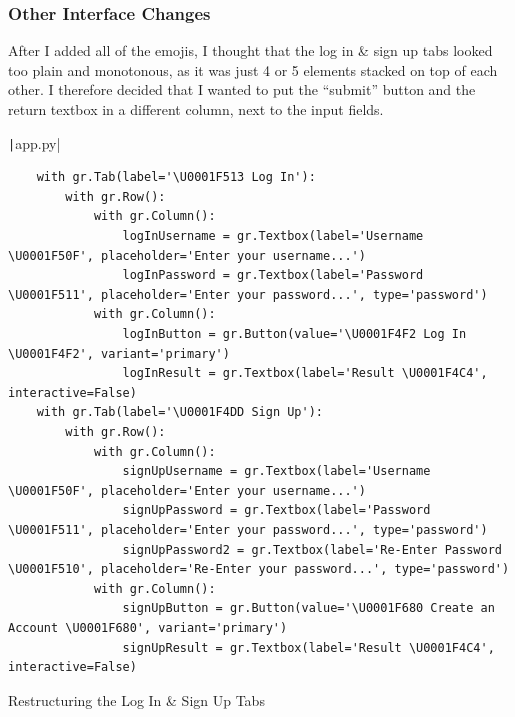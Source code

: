 \documentclass[12pt]{report}
\newcommand{\pil}[1]{\protect\texttt|#1|}
\begin{document}
\begin{center}
\end{center}

\subsubsection{Other Interface Changes}
After I added all of the emojis, I thought that the log in \& sign up tabs looked too plain and monotonous, as it was just 4 or 5 elements stacked on top of each other. I therefore decided that I wanted to put the ``submit'' button and the return textbox in a different column, next to the input fields.

\begin{listing}[H]
\pil{app.py}
\begin{verbatim}
    with gr.Tab(label='\U0001F513 Log In'):
        with gr.Row():
            with gr.Column():
                logInUsername = gr.Textbox(label='Username \U0001F50F', placeholder='Enter your username...')
                logInPassword = gr.Textbox(label='Password \U0001F511', placeholder='Enter your password...', type='password')
            with gr.Column():
                logInButton = gr.Button(value='\U0001F4F2 Log In \U0001F4F2', variant='primary')
                logInResult = gr.Textbox(label='Result \U0001F4C4', interactive=False)
    with gr.Tab(label='\U0001F4DD Sign Up'):
        with gr.Row():
            with gr.Column():
                signUpUsername = gr.Textbox(label='Username \U0001F50F', placeholder='Enter your username...')
                signUpPassword = gr.Textbox(label='Password \U0001F511', placeholder='Enter your password...', type='password')
                signUpPassword2 = gr.Textbox(label='Re-Enter Password \U0001F510', placeholder='Re-Enter your password...', type='password')
            with gr.Column():
                signUpButton = gr.Button(value='\U0001F680 Create an Account \U0001F680', variant='primary')
                signUpResult = gr.Textbox(label='Result \U0001F4C4', interactive=False)
\end{verbatim}
\caption{Restructuring the Log In \& Sign Up Tabs}\label{cs:restructureTabs}
\end{listing}
\end{document}

